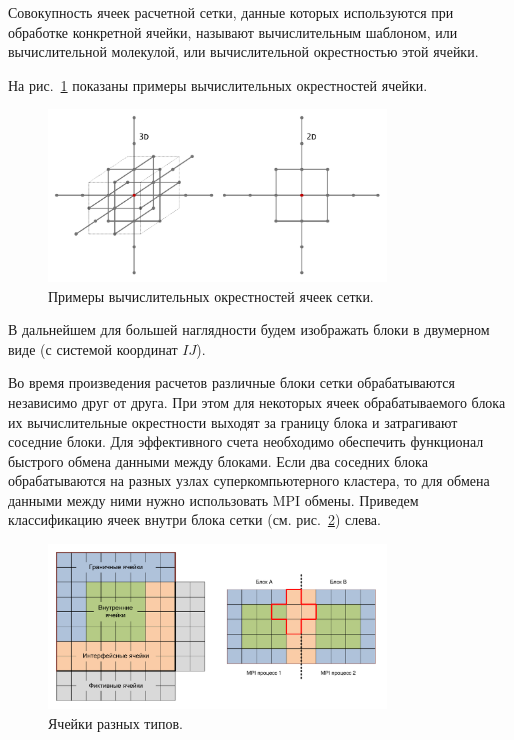 \begin{definition}
Совокупность ячеек расчетной сетки, данные которых используются при обработке конкретной ячейки, называют вычислительным шаблоном, или вычислительной молекулой, или вычислительной окрестностью этой ячейки\label{term:cell_calc_template}.
\end{definition}

На рис.~\ref{fig:text_2_block_cell_delta} показаны примеры вычислительных окрестностей ячейки.

\begin{figure}[ht]
\centering
\includegraphics[width=0.8\textwidth]{./pics/text_2_block/3-cell-delta.pdf}
\singlespacing
{}\caption{Примеры вычислительных окрестностей ячеек сетки.}
\label{fig:text_2_block_cell_delta}
\end{figure}

В дальнейшем для большей наглядности будем изображать блоки в двумерном виде (с системой координат $IJ$).

Во время произведения расчетов различные блоки сетки обрабатываются независимо друг от друга.
При этом для некоторых ячеек обрабатываемого блока их вычислительные окрестности выходят за границу блока и затрагивают соседние блоки.
Для эффективного счета необходимо обеспечить функционал быстрого обмена данными между блоками.
Если два соседних блока обрабатываются на разных узлах суперкомпьютерного кластера, то для обмена данными между ними нужно использовать MPI обмены.
Приведем классификацию ячеек внутри блока сетки (см. рис.~\ref{fig:text_2_block_block_cells}) слева.

\begin{figure}[ht]
\centering
\includegraphics[width=0.8\textwidth]{./pics/text_2_block/4-block-cells.pdf}
\singlespacing
{}\caption{Ячейки разных типов.}
\label{fig:text_2_block_block_cells}
\end{figure}


